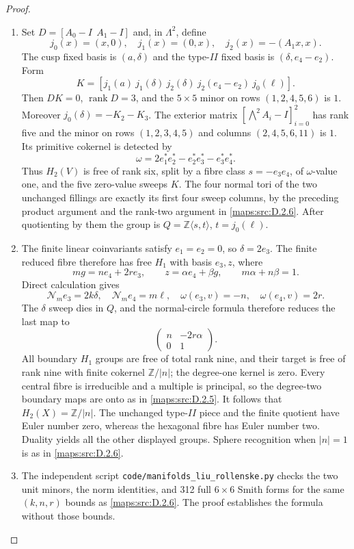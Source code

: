 \begin{proof}
\begin{enumerate}[label=\arabic*.,leftmargin=*]
\item Set $D=[A_0-I\ \ A_1-I]$ and, in $\Lambda^2$, define
\[
 j_0(x)=(x,0),\quad j_1(x)=(0,x),\quad
 j_2(x)=-(A_1x,x).
\]
The cusp fixed basis is $(a,\delta)$ and the type-$II$ fixed
basis is $(\delta,e_4-e_2)$. Form
\[
 K=[j_1(a)\ j_1(\delta)\ j_2(\delta)\
       j_2(e_4-e_2)\ j_0(\ell)].
\]
Then $DK=0$, $\operatorname{rank}D=3$, and the $5\times5$
minor on rows $(1,2,4,5,6)$ is $1$.
Moreover $j_0(\delta)=-K_2-K_3$.
The exterior matrix $[\bigwedge^2A_i-I]_{i=0}^2$ has rank
five and the minor on rows $(1,2,3,4,5)$ and columns
$(2,4,5,6,11)$ is $1$. Its primitive cokernel is detected by
\[
 \omega=2e_1^*e_2^*-e_2^*e_3^*-e_3^*e_4^*.
\]
Thus $H_2(V)$ is free of rank six, split by a fibre class
$s=-e_3e_4$, of $\omega$-value one, and the five zero-value
sweeps $K$. The four normal tori of the two unchanged fillings
are exactly its first four sweep columns, by the preceding
product argument and the rank-two argument in \ref{maps:src:D.2.6}.
After quotienting by them the group is
$Q=\mathbb Z\langle s,t\rangle$, $t=j_0(\ell)$.

\item The finite linear coinvariants satisfy $e_1=e_2=0$, so
$\delta=2e_3$. The finite reduced fibre therefore has free
$H_1$ with basis $e_3,z$, where
\[
 mg=ne_4+2r e_3,\qquad z=\alpha e_4+\beta g,
 \qquad m\alpha+n\beta=1.
\]
Direct calculation gives
\[
 \mathcal N_me_3=2k\delta,\quad
 \mathcal N_me_4=m\ell,\quad
 \omega(e_3,v)=-n,\quad \omega(e_4,v)=2r.
\]
The $\delta$ sweep dies in $Q$, and the normal-circle formula
therefore reduces the last map to
\[
 \begin{pmatrix}n&-2r\alpha\\0&1\end{pmatrix}.
\]
All boundary $H_1$ groups are free of total rank nine, and their
target is free of rank nine with finite cokernel
$\mathbb Z/|n|$; the degree-one kernel is zero.
Every central fibre is irreducible and a multiple is principal,
so the degree-two boundary maps are onto as in \ref{maps:src:D.2.5}.
It follows that $H_2(X)=\mathbb Z/|n|$.
The unchanged type-$II$ piece and the finite quotient have
Euler number zero, whereas the hexagonal fibre has Euler
number two. Duality yields all the other displayed groups.
Sphere recognition when $|n|=1$ is as in \ref{maps:src:D.2.6}.

\item The independent script
\texttt{code/manifolds\_liu\_rollenske.py} checks the two
unit minors, the norm identities, and 312 full $6\times6$
Smith forms for the same $(k,n,r)$ bounds as \ref{maps:src:D.2.6}.
The proof establishes the formula without those bounds.
\end{enumerate}
\end{proof}

